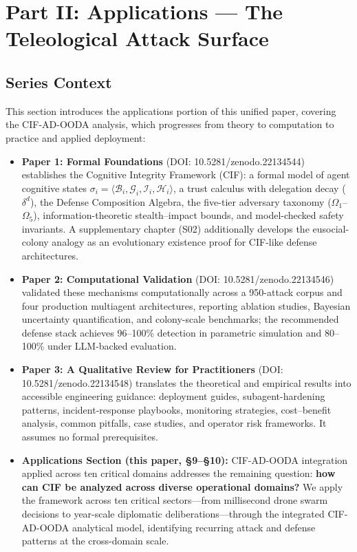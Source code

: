 \documentclass[
]{article}
\providecommand{\tightlist}{%
  \setlength{\itemsep}{0pt}\setlength{\parskip}{0pt}}
\begin{document}
\newpage

\section{Part II: Applications --- The Teleological Attack
Surface}\label{sec:applications_intro}

\subsection{Series Context}\label{series-context}

This section introduces the applications portion of this unified paper,
covering the CIF-AD-OODA analysis, which progresses from theory to
computation to practice and applied deployment:

\begin{itemize}
\tightlist
\item
  \textbf{Paper 1: Formal Foundations} \cite{friedman2026cogsec1} (DOI:
  10.5281/zenodo.22134544) establishes the Cognitive Integrity Framework
  (CIF): a formal model of agent cognitive states
  \(\sigma_i = \langle \mathcal{B}_i, \mathcal{G}_i, \mathcal{I}_i, \mathcal{H}_i \rangle\),
  a trust calculus with delegation decay (\(\delta^d\)), the Defense
  Composition Algebra, the five-tier adversary taxonomy
  (\(\Omega_1\)--\(\Omega_5\)), information-theoretic stealth--impact
  bounds, and model-checked safety invariants. A supplementary chapter
  (S02) additionally develops the eusocial-colony analogy as an
  evolutionary existence proof for CIF-like defense architectures.
\item
  \textbf{Paper 2: Computational Validation} \cite{friedman2026cogsec2}
  (DOI: 10.5281/zenodo.22134546) validated these mechanisms
  computationally across a 950-attack corpus and four production
  multiagent architectures, reporting ablation studies, Bayesian
  uncertainty quantification, and colony-scale benchmarks; the
  recommended defense stack achieves 96--100\% detection in parametric
  simulation and 80--100\% under LLM-backed evaluation.
\item
  \textbf{Paper 3: A Qualitative Review for Practitioners}
  \cite{friedman2026cogsec3} (DOI: 10.5281/zenodo.22134548) translates
  the theoretical and empirical results into accessible engineering
  guidance: deployment guides, subagent-hardening patterns,
  incident-response playbooks, monitoring strategies, cost--benefit
  analysis, common pitfalls, case studies, and operator risk frameworks.
  It assumes no formal prerequisites.
\item
  \textbf{Applications Section (this paper, §9--§10):} CIF-AD-OODA
  integration applied across ten critical domains addresses the
  remaining question: \textbf{how can CIF be analyzed across diverse
  operational domains?} We apply the framework across ten critical
  sectors---from millisecond drone swarm decisions to year-scale
  diplomatic deliberations---through the integrated CIF-AD-OODA
  analytical model, identifying recurring attack and defense patterns at
  the cross-domain scale.
\end{itemize}
\end{document}
